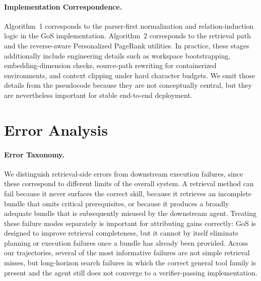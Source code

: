 \paragraph{Implementation Correspondence.}
Algorithm~1 corresponds to the parser-first normalization and relation-induction logic in the GoS implementation. Algorithm~2 corresponds to the retrieval path and the reverse-aware Personalized PageRank utilities. In practice, these stages additionally include engineering details such as workspace bootstrapping, embedding-dimension checks, source-path rewriting for containerized environments, and context clipping under hard character budgets. We omit those details from the pseudocode because they are not conceptually central, but they are nevertheless important for stable end-to-end deployment.

\section{Error Analysis}

\paragraph{Error Taxonomy.}
We distinguish retrieval-side errors from downstream execution failures, since these correspond to different limits of the overall system. A retrieval method can fail because it never surfaces the correct skill, because it retrieves an incomplete bundle that omits critical prerequisites, or because it produces a broadly adequate bundle that is subsequently misused by the downstream agent. Treating these failure modes separately is important for attributing gains correctly: GoS is designed to improve retrieval completeness, but it cannot by itself eliminate planning or execution failures once a bundle has already been provided. Across our trajectories, several of the most informative failures are not simple retrieval misses, but long-horizon search failures in which the correct general tool family is present and the agent still does not converge to a verifier-passing implementation.

